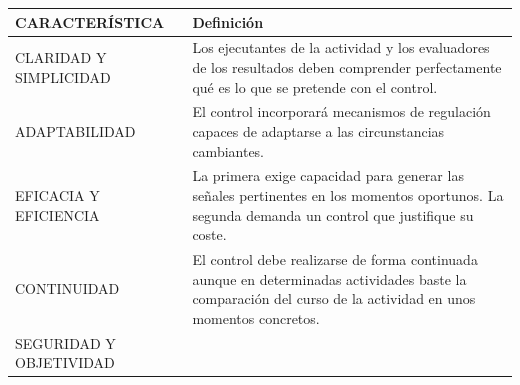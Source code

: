 \documentclass[
]{krantz}
\begin{document}
\begin{longtable}[]{@{}ll@{}}
\toprule
\begin{minipage}[b]{0.55\columnwidth}\raggedright
CARACTERÍSTICA\strut
\end{minipage} & \begin{minipage}[b]{0.39\columnwidth}\raggedright
Definición\strut
\end{minipage}\tabularnewline
\midrule
\endhead
\begin{minipage}[t]{0.55\columnwidth}\raggedright
CLARIDAD Y SIMPLICIDAD\strut
\end{minipage} & \begin{minipage}[t]{0.39\columnwidth}\raggedright
Los ejecutantes de la actividad y los evaluadores de los resultados deben comprender perfectamente qué es lo que se pretende con el control.\strut
\end{minipage}\tabularnewline
\begin{minipage}[t]{0.55\columnwidth}\raggedright
ADAPTABILIDAD\strut
\end{minipage} & \begin{minipage}[t]{0.39\columnwidth}\raggedright
El control incorporará mecanismos de regulación capaces de adaptarse a las circunstancias cambiantes.\strut
\end{minipage}\tabularnewline
\begin{minipage}[t]{0.55\columnwidth}\raggedright
EFICACIA Y EFICIENCIA\strut
\end{minipage} & \begin{minipage}[t]{0.39\columnwidth}\raggedright
La primera exige capacidad para generar las señales pertinentes en los momentos oportunos. La segunda demanda un control que justifique su coste.\strut
\end{minipage}\tabularnewline
\begin{minipage}[t]{0.55\columnwidth}\raggedright
CONTINUIDAD\strut
\end{minipage} & \begin{minipage}[t]{0.39\columnwidth}\raggedright
El control debe realizarse de forma continuada aunque en determinadas actividades baste la comparación del curso de la actividad en unos momentos concretos.\strut
\end{minipage}\tabularnewline
\begin{minipage}[t]{0.55\columnwidth}\raggedright
SEGURIDAD Y OBJETIVIDAD\strut
\end{minipage} & \begin{minipage}[t]{0.39\columnwidth}\raggedright

\end{minipage}
\end{longtable}
\end{document}
